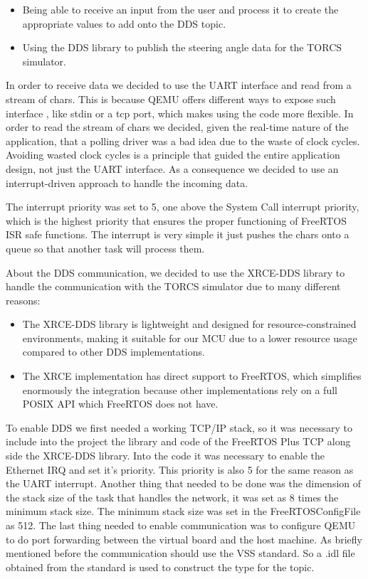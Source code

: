 \documentclass[10pt,a4]{article}
\begin{document}
\begin{itemize}
  \item Being able to receive an input from the user and process it to create the appropriate values to add onto the DDS topic.
  \item Using the DDS library to publish the steering angle data for the TORCS simulator.
\end{itemize}

\par In order to receive data we decided to use the UART interface and read from a stream of chars. This is because QEMU
offers different ways to expose such interface , like stdin or a tcp port, which makes using the code more flexible.
In order to read the stream of chars we decided, given the real-time nature of the application, that a polling driver was
a bad idea due to the waste of clock cycles. Avoiding wasted clock cycles is a principle that guided the entire application
design, not just the UART interface. As a consequence we decided to use an interrupt-driven approach to handle the incoming data.

\par The interrupt priority was set to 5, one above the System Call interrupt priority, which is the highest priority that ensures the proper
functioning of FreeRTOS ISR safe functions. The interrupt is very simple it just pushes the chars onto a queue so that another
task will process them.

\par About the DDS communication, we decided to use the XRCE-DDS library to handle the communication with the TORCS simulator due to many different reasons:

\begin{itemize}
  \item The XRCE-DDS library is lightweight and designed for resource-constrained environments, making it suitable for our MCU due
        to a lower resource usage compared to other DDS implementations.
  \item The XRCE implementation has direct support to FreeRTOS, which simplifies enormously the integration because other
        implementations rely on a full POSIX API which FreeRTOS does not have.
\end{itemize}
\par To enable DDS we first needed a working TCP/IP stack, so it was necessary to include into the project the library and
code of the FreeRTOS Plus TCP along side the XRCE-DDS library.
Into the code it was necessary to enable the Ethernet IRQ and set it's priority. This priority is also 5 for the same reason
as the UART interrupt.
Another thing that needed to be done was the dimension of the stack size of the task that handles the network, it was set as 8 times the minimum stack size.
The minimum stack size was set in the FreeRTOSConfigFile as 512.
The last thing needed to enable communication was to configure QEMU to do port forwarding between the virtual board and the host machine.
As briefly mentioned before the communication should use the VSS standard. So a .idl file obtained from the standard is used to construct the type for the topic.
\end{document}
